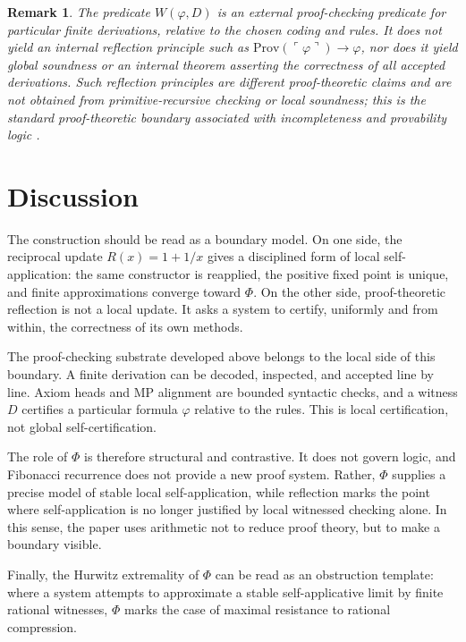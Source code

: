 \documentclass[letterpaper,10pt]{article}
\theoremstyle{upright}
\theoremstyle{upright}
\newtheorem{remark}[theorem]{Remark}
\begin{document}
\begin{remark}
	The predicate $W(\varphi,D)$ is an external proof-checking predicate for particular finite derivations, relative to the chosen coding and rules. It does not yield an internal reflection principle such as $\mathrm{Prov}(\ulcorner\varphi\urcorner)\to\varphi$, nor does it yield global soundness or an internal theorem asserting the correctness of all accepted derivations. Such reflection principles are different proof-theoretic claims and are not obtained from primitive-recursive checking or local soundness; this is the standard proof-theoretic boundary associated with incompleteness and provability logic \citep{g31,lob55}.
\end{remark}

\section{Discussion}\label{sec:discussion}

The construction should be read as a boundary model. On one side, the reciprocal update $R(x)=1+1/x$ gives a disciplined form of local self-application: the same constructor is reapplied, the positive fixed point is unique, and finite approximations converge toward $\Phi$. On the other side, proof-theoretic reflection is not a local update. It asks a system to certify, uniformly and from within, the correctness of its own methods.

The proof-checking substrate developed above belongs to the local side of this boundary. A finite derivation can be decoded, inspected, and accepted line by line. Axiom heads and \textsc{MP} alignment are bounded syntactic checks, and a witness $D$ certifies a particular formula $\varphi$ relative to the rules. This is local certification, not global self-certification.

The role of $\Phi$ is therefore structural and contrastive. It does not govern logic, and Fibonacci recurrence does not provide a new proof system. Rather, $\Phi$ supplies a precise model of stable local self-application, while reflection marks the point where self-application is no longer justified by local witnessed checking alone. In this sense, the paper uses arithmetic not to reduce proof theory, but to make a boundary visible.

Finally, the Hurwitz extremality of $\Phi$ can be read as an obstruction template: where a system attempts to approximate a stable self-applicative limit by finite rational witnesses, $\Phi$ marks the case of maximal resistance to rational compression.
\end{document}
